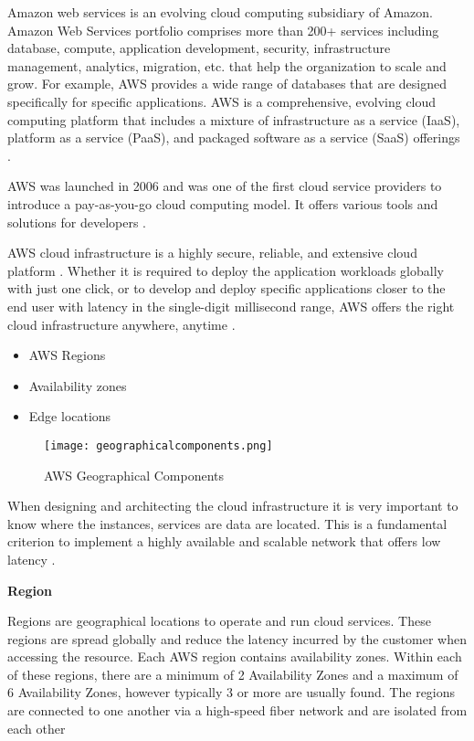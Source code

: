 \par Amazon web services is an evolving cloud computing subsidiary of Amazon. Amazon Web Services portfolio comprises more than 200+ services including database, compute, application development, security, infrastructure management, analytics, migration, etc. that help the organization to scale and grow. For example, AWS provides a wide range of databases that are designed specifically for specific applications. AWS  is a comprehensive, evolving cloud computing platform that includes a mixture of infrastructure as a service (IaaS), platform as a service (PaaS), and packaged software as a service (SaaS) offerings \cite{16}.
\par AWS was launched in 2006 and was one of the first cloud service providers to introduce a pay-as-you-go cloud computing model. It offers various tools and solutions for developers \cite{17}.

\par AWS cloud infrastructure is a highly secure, reliable, and extensive cloud platform \cite{18}. Whether it is required to deploy the application workloads globally with just one click, or to develop and deploy specific applications closer to the end user with latency in the single-digit millisecond range, AWS offers the right cloud infrastructure anywhere, anytime \cite{19}.

\begin{itemize}
    \item AWS Regions
    \item Availability zones
    \item Edge locations
\end{itemize}

\begin{figure}
    \centering
    \texttt{[image: geographicalcomponents.png]}
    \caption{AWS Geographical Components}
    \label{fig:identities}
\end{figure}

\par When designing and architecting the cloud infrastructure it is very important to know where the instances, services are data are located. This is a fundamental criterion to implement a highly available and scalable network that offers low latency \cite{19}.

\textbf{Region}
\par Regions are geographical locations to operate and run cloud services. These regions are spread globally and reduce the latency incurred by the customer when accessing the resource. Each AWS region contains availability zones. Within each of these regions, there are a minimum of 2 Availability Zones and a maximum of 6 Availability Zones, however typically 3 or more are usually found. The regions are connected to one another via a high-speed fiber network and are isolated from each other \cite{20}


